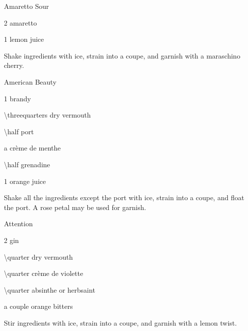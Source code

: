 \begin{Cocktail}{Amaretto Sour}
	\begin{Ingredients}
	\item \SI{2}{\oz} amaretto
	\item \SI{1}{\oz} lemon juice
	\end{Ingredients}
	
	\begin{Instructions}
	Shake ingredients with ice, strain into a coupe, and garnish with a maraschino cherry.
	\end{Instructions}
\end{Cocktail}

\begin{Cocktail}{American Beauty}
	\begin{Ingredients}
	\item \SI{1}{\oz} brandy
	\item \SI{\threequarters}{\oz} dry vermouth
	\item \SI{\half}{\oz} port
	\item a \si{\dash} cr\`{e}me de menthe
	\item \SI{\half}{\oz} grenadine
	\item \SI{1}{\oz} orange juice
	\end{Ingredients}
	
	\begin{Instructions}
	Shake all the ingredients except the port with ice, strain into a coupe, and float the port.  A rose petal may be used for garnish.
	\end{Instructions}
\end{Cocktail}

\begin{Cocktail}{Attention}
	\begin{Ingredients}
	\item \SI{2}{\oz} gin
	\item \SI{\quarter}{\oz} dry vermouth
	\item \SI{\quarter}{\oz} cr\`{e}me de violette
	\item \SI{\quarter}{\oz} absinthe or herbsaint
	\item a couple \si{\dashes} orange bitters
	\end{Ingredients}
	
	\begin{Instructions}
	Stir ingredients with ice, strain into a coupe, and garnish with a lemon twist.
	\end{Instructions}
\end{Cocktail}

